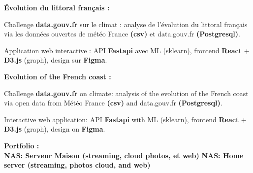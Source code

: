 {
\textbf{{Évolution du littoral français : \href{https://\littoral}{\littoral}}}
\hfill {}
\begin{zitemize}
    \item Challenge \textbf{data.gouv.fr} sur le climat : analyse de l'évolution du littoral français via les données ouvertes de météo France \textbf{(csv)} et data.gouv.fr \textbf{(Postgresql)}.
    \item Application web interactive : API \textbf{Fastapi} avec ML (sklearn), frontend \textbf{React} + \textbf{D3.js} (graph), design sur \textbf{Figma}.
\end{zitemize}
}
{
\textbf{{Evolution of the French coast : \href{https://\littoral}{\littoral}}}
\hfill {}
\begin{zitemize}
    \item Challenge \textbf{data.gouv.fr} on climate: analysis of the evolution of the French coast via open data from Météo France \textbf{(csv)} and data.gouv.fr \textbf{(Postgresql)}.
    \item Interactive web application: API \textbf{Fastapi} with ML (sklearn), frontend \textbf{React} + \textbf{D3.js} (graph), design on \textbf{Figma}.
\end{zitemize}
}
\textbf{{Portfolio : \href{https://\portfolio}{\portfolio}}}
\hfill {}\\[1.em]

{
\textbf{{NAS: Serveur Maison (streaming, cloud photos, et web)}}
}
{
\textbf{{NAS: Home server (streaming, photos cloud, and web)}}
}
\hfill {}

